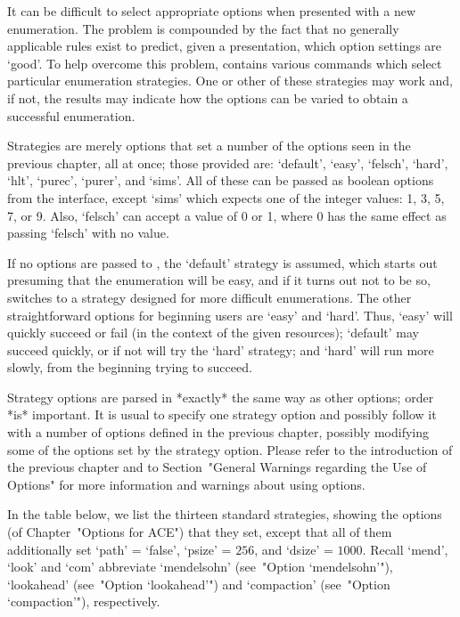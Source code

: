 
It can be difficult to select appropriate options when presented  with
a new enumeration. The problem is  compounded  by  the  fact  that  no
generally applicable rules exist to  predict,  given  a  presentation,
which option settings are \lq{}good'. To help overcome  this  problem,
{\ACE} contains various commands which select  particular  enumeration
strategies. One or other of these strategies may work and, if not, the
results may indicate how  the  options  can  be  varied  to  obtain  a
successful enumeration.

Strategies are merely options that set a number of the options seen in
the previous chapter, all at  once;  those  provided  are:  `default',
`easy', `felsch', `hard', `hlt', `purec', `purer', and `sims'. All  of
these can be passed as boolean  options  from  the  {\ACE}  interface,
except `sims' which expects one of the integer values: 1, 3, 5, 7,  or
9. Also, `felsch' can accept a value of 0 or 1, where 0 has  the  same
effect as passing `felsch' with no value.

If no options are passed to {\ACE}, the `default' strategy is assumed,
which starts out presuming that the enumeration will be easy,  and  if
it turns out not to be so, {\ACE} switches to a strategy designed  for
more difficult enumerations. The  other  straightforward  options  for
beginning users are `easy'  and  `hard'.  Thus,  `easy'  will  quickly
succeed or fail (in the context of the given resources); `default' may
succeed quickly, or if not will try the `hard'  strategy;  and  `hard'
will run more slowly, from the beginning trying to succeed.

Strategy options are  parsed  in  *exactly*  the  same  way  as  other
options; order *is* important. It is usual  to  specify  one  strategy
option and possibly follow it with a number of options defined in  the
previous chapter, possibly modifying some of the options  set  by  the
strategy option. Please refer to  the  introduction  of  the  previous
chapter and to Section~"General Warnings regarding the Use of Options"
for more  information  and  warnings  about using options.

In the table below, we list the thirteen standard strategies,  showing
the options (of Chapter~"Options for ACE") that they set, except  that
all of them additionally set `path' = `false', `psize'  =  $256$,  and
`dsize'  =  $1000$.  Recall  `mend',  `look'  and   `com'   abbreviate
`mendelsohn'  (see~"Option  `mendelsohn'"),  `lookahead'  (see~"Option
`lookahead'")   and    `compaction'    (see~"Option    `compaction'"),
respectively.


